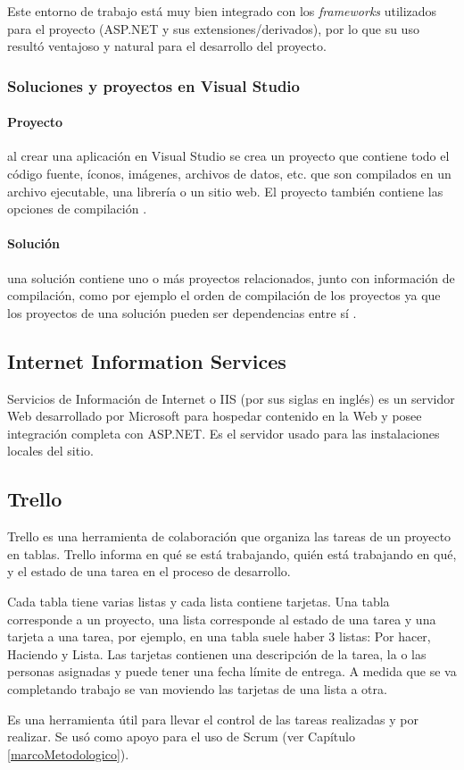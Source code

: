 Este entorno de trabajo está muy bien integrado con los \textit{frameworks} utilizados para el proyecto (ASP.NET y sus extensiones/derivados), por lo que su uso resultó ventajoso y natural para el desarrollo del proyecto.

\subsubsection{Soluciones y proyectos en Visual Studio}
\paragraph{Proyecto} al crear una aplicación en Visual Studio se crea un proyecto que contiene todo el código fuente, íconos, imágenes, archivos de datos, etc. que son compilados en un archivo ejecutable, una librería o un sitio web. El proyecto también contiene las opciones de compilación \cite{visualStudioSolutionMicrosoft}.
\paragraph{Solución} una solución contiene uno o más proyectos relacionados, junto con información de compilación, como por ejemplo el orden de compilación de los proyectos ya que los proyectos de una solución pueden ser dependencias entre sí \cite{visualStudioSolutionMicrosoft}.

\subsection{Internet Information Services}
Servicios de Información de Internet o IIS \cite{IISMicrosoft} (por sus siglas en inglés) es un servidor Web desarrollado por Microsoft para hospedar contenido en la Web y posee integración completa con ASP.NET. Es el servidor usado para las instalaciones locales del sitio.

\subsection{Trello}
Trello \cite{trelloAbout} es una herramienta de colaboración que organiza las tareas de un proyecto en tablas. Trello informa en qué se está trabajando, quién está trabajando en qué, y el estado de una tarea en el proceso de desarrollo.

Cada tabla tiene varias listas y cada lista contiene tarjetas. Una tabla corresponde a un proyecto, una lista corresponde al estado de una tarea y una tarjeta a una tarea, por ejemplo, en una tabla suele haber 3 listas: Por hacer, Haciendo y Lista. Las tarjetas contienen una descripción de la tarea, la o las personas asignadas y puede tener una fecha límite de entrega. A medida que se va completando trabajo se van moviendo las tarjetas de una lista a otra.

Es una herramienta útil para llevar el control de las tareas realizadas y por realizar. Se usó como apoyo para el uso de Scrum (ver Capítulo \ref{marcoMetodologico}).